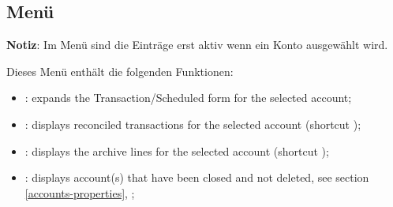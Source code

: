 \subsection{Menü \label{home-menus-display}}

\textbf{Notiz}: Im Menü  sind die Einträge erst aktiv wenn ein Konto ausgewählt wird.%

Dieses Menü enthält die folgenden Funktionen:%
\vspace{3mm}
\noindent
\begin{minipage}{.7\linewidth}
	\begin{itemize}[rightmargin=.6cm]
	\item {}: expands the Transaction/Scheduled form for the selected account;
	\item {}: displays reconciled transactions for the selected account (shortcut );
	\item {}: displays the archive lines for the selected account (shortcut );
	\item {}: displays account(s) that have been closed and not deleted, see section \vref{accounts-properties}, ; %
	\end{itemize}
\end{minipage}
\hspace{10pt}	
